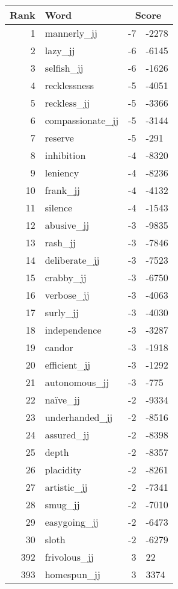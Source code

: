 \begin{longtable}[!htbp]{| rlr@{.}l |}
    \hline
    \textbf{Rank} & \textbf{Word} & \multicolumn{2}{c|}{\textbf{Score}} \\
    \hline
    \endhead
    1 & mannerly\_jj & -7 & -2278 \\
    2 & lazy\_jj & -6 & -6145 \\
    3 & selfish\_jj & -6 & -1626 \\
    4 & recklessness & -5 & -4051 \\
    5 & reckless\_jj & -5 & -3366 \\
    6 & compassionate\_jj & -5 & -3144 \\
    7 & reserve & -5 & -291 \\
    8 & inhibition & -4 & -8320 \\
    9 & leniency & -4 & -8236 \\
    10 & frank\_jj & -4 & -4132 \\
    11 & silence & -4 & -1543 \\
    12 & abusive\_jj & -3 & -9835 \\
    13 & rash\_jj & -3 & -7846 \\
    14 & deliberate\_jj & -3 & -7523 \\
    15 & crabby\_jj & -3 & -6750 \\
    16 & verbose\_jj & -3 & -4063 \\
    17 & surly\_jj & -3 & -4030 \\
    18 & independence & -3 & -3287 \\
    19 & candor & -3 & -1918 \\
    20 & efficient\_jj & -3 & -1292 \\
    21 & autonomous\_jj & -3 & -775 \\
    22 & naïve\_jj & -2 & -9334 \\
    23 & underhanded\_jj & -2 & -8516 \\
    24 & assured\_jj & -2 & -8398 \\
    25 & depth & -2 & -8357 \\
    26 & placidity & -2 & -8261 \\
    27 & artistic\_jj & -2 & -7341 \\
    28 & smug\_jj & -2 & -7010 \\
    29 & easygoing\_jj & -2 & -6473 \\
    30 & sloth & -2 & -6279 \\
    392 & frivolous\_jj & 3 & 22 \\
    393 & homespun\_jj & 3 & 3374 \\

\end{longtable}
